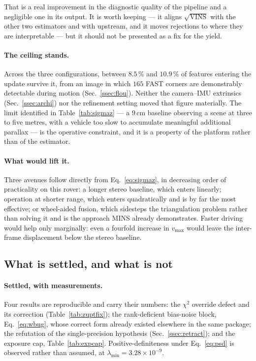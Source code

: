 That is a real improvement in the diagnostic quality of the pipeline and a
negligible one in its output. It is worth keeping --- it aligns
$\sqrt{\text{VINS}}$ with the other two estimators and with upstream, and it
moves rejections to where they are interpretable --- but it should not be
presented as a fix for the yield.

\paragraph{The ceiling stands.} Across the three configurations, between
$8.5\,\%$ and $10.9\,\%$ of features entering the update survive it, from an
image in which $165$ FAST corners are demonstrably detectable during motion
(Sec.~\ref{ssec:flou}). Neither the camera--IMU extrinsics
(Sec.~\ref{ssec:archi}) nor the refinement setting moved that figure
materially. The limit identified in Table~\ref{tab:sigmaz} --- a $9\,\mathrm{cm}$
baseline observing a scene at three to five metres, with a vehicle too slow to
accumulate meaningful additional parallax --- is the operative constraint, and
it is a property of the platform rather than of the estimator.

\paragraph{What would lift it.} Three avenues follow directly from
Eq.~\eqref{eq:sigmaz}, in decreasing order of practicality on this rover: a
longer stereo baseline, which enters linearly; operation at shorter range,
which enters quadratically and is by far the most effective; or wheel-aided
fusion, which sidesteps the triangulation problem rather than solving it and
is the approach MINS already demonstrates. Faster driving would help only
marginally: even a fourfold increase in $v_{\max}$ would leave the inter-frame
displacement below the stereo baseline.

\subsection{What is settled, and what is not}
\label{ssec:bilan}

\paragraph{Settled, with measurements.} Four results are reproducible and
carry their numbers: the $\chi^{2}$ override defect and its correction
(Table~\ref{tab:zuptfix}); the rank-deficient bias-noise block,
Eq.~\eqref{eq:wbug}, whose correct form already existed elsewhere in the same
package; the refutation of the single-precision hypothesis
(Sec.~\ref{ssec:retract}); and the exposure cap, Table~\ref{tab:expcap}.
Positive-definiteness under Eq.~\eqref{eq:psd} is observed rather than
assumed, at $\lambda_{\min}=3.28\times10^{-9}$.

